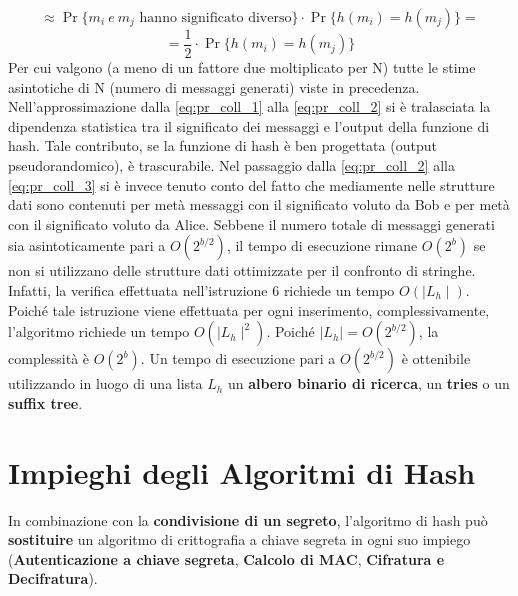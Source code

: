\begin{equation} \label{eq:pr_coll_2}
\approx \Pr \{m_i \: e \: m_j  \mbox{ hanno significato diverso} \} \cdot \Pr \{ h(m_i) = h(m_j) \} = 
\end{equation}
\begin{equation} \label{eq:pr_coll_3}
= \frac{1}{2} \cdot \Pr \{ h(m_i) = h(m_j) \}
\end{equation}
Per cui valgono (a meno di un fattore due moltiplicato per N) tutte le stime asintotiche di N (numero di messaggi generati) viste in precedenza. 
\newline \newline
Nell'approssimazione dalla \ref{eq:pr_coll_1} alla \ref{eq:pr_coll_2} si è tralasciata la dipendenza statistica tra il significato dei messaggi e l'output della funzione di hash. Tale contributo, se la funzione di hash è ben progettata (output pseudorandomico), è trascurabile. Nel passaggio dalla \ref{eq:pr_coll_2} alla \ref{eq:pr_coll_3} si è invece tenuto conto del fatto che mediamente nelle strutture dati sono contenuti per metà messaggi con il significato voluto da Bob e per metà con il significato voluto da Alice. 
\newline \newline
Sebbene il numero totale di messaggi generati sia asintoticamente pari a $O(2^{b/2})$, il tempo di esecuzione rimane $O(2^b)$ se non si utilizzano delle strutture dati ottimizzate per il confronto di stringhe. Infatti, la verifica effettuata nell'istruzione 6 richiede un tempo $O(\mid L_h \mid)$. Poiché tale istruzione viene effettuata per ogni inserimento, complessivamente, l'algoritmo richiede un tempo $O(\mid L_h \mid ^2)$. Poiché $\mid L_h \mid = O(2^{b/2})$, la complessità è $O(2^b)$. 
\newline \newline
Un tempo di esecuzione pari a $O(2^{b/2})$ è ottenibile utilizzando in luogo di una lista $L_h$ un \textbf{albero binario di ricerca}, un \textbf{tries} o un \textbf{suffix tree}. 

\section{Impieghi degli Algoritmi di Hash}
In combinazione con la \textbf{condivisione di un segreto}, l'algoritmo di hash può \textbf{sostituire} un algoritmo di crittografia a chiave segreta in ogni suo impiego (\textbf{Autenticazione a chiave segreta}, \textbf{Calcolo di MAC}, \textbf{Cifratura e Decifratura}).

